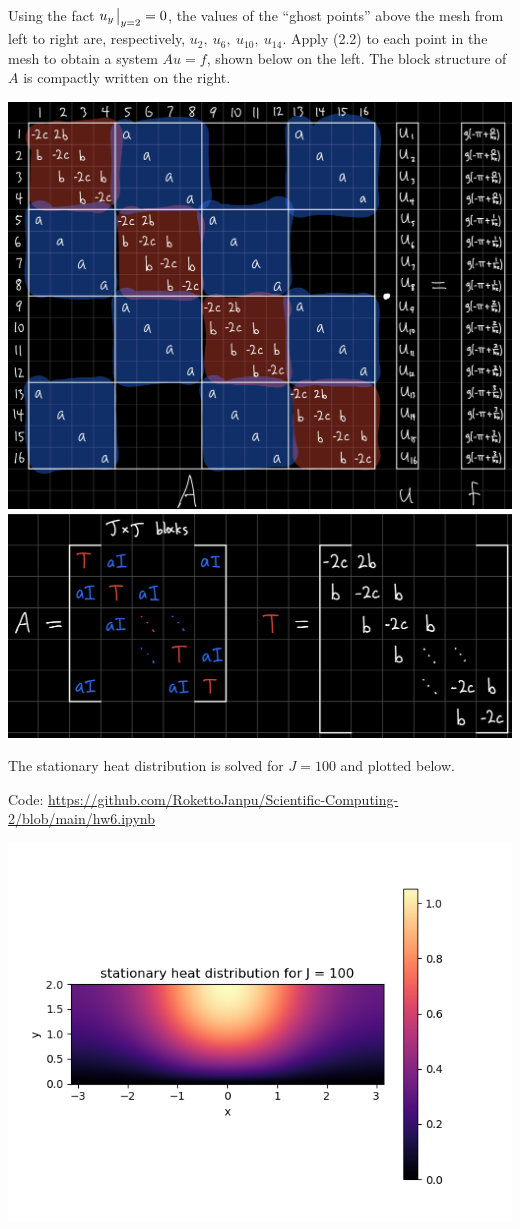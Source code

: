 \documentclass{article}
\begin{document}
Using the fact $u_y\eval_{y=2}=0$, the values of the ``ghost points'' above the mesh from left to right are, respectively, $u_2,~u_6,~u_{10},~u_{14}$. Apply (2.2) to each point in the mesh to obtain a system $Au=f$, shown below on the left. The block structure of $A$ is compactly written on the right.

\includegraphics[scale=.1]{hw6 2 full}
\includegraphics[scale=.09]{hw6 2 block}

The stationary heat distribution is solved for $J=100$ and plotted below.

Code: \url{https://github.com/RokettoJanpu/Scientific-Computing-2/blob/main/hw6.ipynb}

\begin{center}
	\includegraphics[scale=1]{hw6 2 plot}
\end{center}
\end{document}
